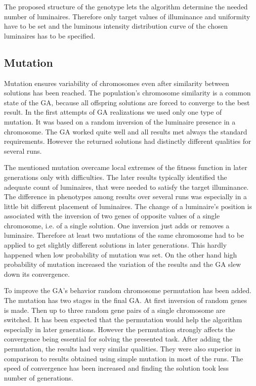 The proposed structure of the genotype lets the algorithm determine the needed number of luminaires. Therefore only target values of illuminance and uniformity have to be set and the luminous intensity distribution curve of the chosen luminaires has to be specified.

\subsection{Mutation}
Mutation ensures variability of chromosomes even after similarity between solutions has been reached. The population's chromosome similarity is a common state of the GA, because all offspring solutions are forced to converge to the best result. In the first attempts of GA realizations we used only one type of mutation. It was based on a random inversion of the luminaire presence in a chromosome. The GA worked quite well and all results met always the standard requirements. However the returned solutions had distinctly different qualities for several runs.

The mentioned mutation overcame local extremes of the fitness function in later generations only with difficulties. The later results typically identified the adequate count of luminaires, that were needed to satisfy the target illuminance. The difference in phenotypes among results over several runs was especially in a little bit different placement of luminaires. The change of a luminaire's position is associated with the inversion of two genes of opposite values of a single chromosome, i.e. of a single solution. One inversion just adds or removes a luminaire. Therefore at least two mutations of the same chromosome had to be applied to get slightly different solutions in later generations. This hardly happened when low probability of mutation was set. On the other hand high probability of mutation increased the variation of the results and the GA slew down its convergence.

To improve the GA's behavior random chromosome permutation has been added. The mutation has two stages in the final GA. At first inversion of random genes is made. Then up to three random gene pairs of a single chromosome are switched. It has been expected that the permutation would help the algorithm especially in later generations. However the permutation strongly affects the convergence being essential for solving the presented task. After adding the permutation, the results had very similar qualities. They were also superior in comparison to results obtained using simple mutation in most of the runs. The speed of convergence has been increased and finding the solution took less number of generations.
